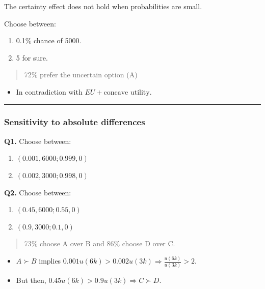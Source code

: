 \documentclass[
  letterpaper,
  DIV=11,
  numbers=noendperiod]{scrartcl}
\providecommand{\tightlist}{%
  \setlength{\itemsep}{0pt}\setlength{\parskip}{0pt}}\usepackage{longtable,booktabs,array}
\begin{document}
The certainty effect does not hold when probabilities are small.

Choose between:

\begin{enumerate}
\def\labelenumi{(\Alph{enumi})}
\tightlist
\item
  0.1\% chance of 5000.
\item
  5 for sure.
\end{enumerate}

\begin{quote}
72\% prefer the uncertain option (A)
\end{quote}

\begin{itemize}
\tightlist
\item
  In contradiction with \(EU + \text{concave utility}.\)
\end{itemize}

\begin{center}\rule{0.5\linewidth}{0.5pt}\end{center}

\subsubsection{Sensitivity to absolute
differences}\label{sensitivity-to-absolute-differences}

\textbf{Q1.} Choose between:

\begin{enumerate}
\def\labelenumi{(\Alph{enumi})}
\tightlist
\item
  \((0.001, 6000; 0.999, 0)\)
\item
  \((0.002, 3000; 0.998, 0)\)
\end{enumerate}

\textbf{Q2.} Choose between:

\begin{enumerate}
\def\labelenumi{(\Alph{enumi})}
\setcounter{enumi}{2}
\tightlist
\item
  \((0.45, 6000; 0.55, 0)\)
\item
  \((0.9, 3000; 0.1, 0)\)
\end{enumerate}

\begin{quote}
73\% choose A over B and 86\% choose D over C.
\end{quote}

\begin{itemize}
\item
  \(A\succ B\) implies
  \(0.001 u(6k) > 0.002 u(3k) \Rightarrow \frac{u(6k)}{u(3k)} > 2.\)
\item
  But then, \(0.45 u(6k)  > 0.9 u(3k) \Rightarrow C \succ D.\)
\end{itemize}
\end{document}
